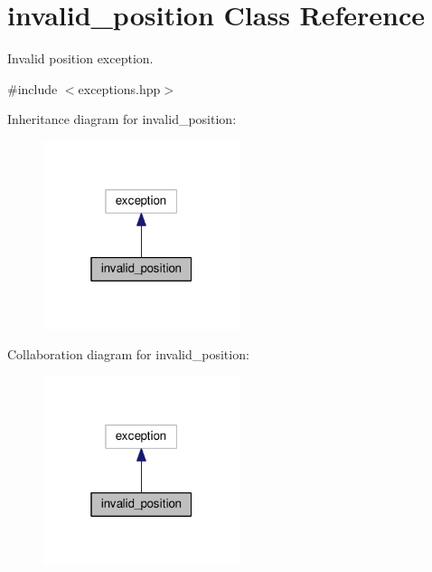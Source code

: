 \hypertarget{classinvalid__position}{}\section{invalid\+\_\+position Class Reference}
\label{classinvalid__position}


Invalid position exception.  




{\ttfamily \#include $<$exceptions.\+hpp$>$}



Inheritance diagram for invalid\+\_\+position\+:\nopagebreak
\begin{figure}[H]
\begin{center}
\leavevmode
\includegraphics[width=163pt]{classinvalid__position__inherit__graph}
\end{center}
\end{figure}


Collaboration diagram for invalid\+\_\+position\+:\nopagebreak
\begin{figure}[H]
\begin{center}
\leavevmode
\includegraphics[width=163pt]{classinvalid__position__coll__graph}
\end{center}
\end{figure}
